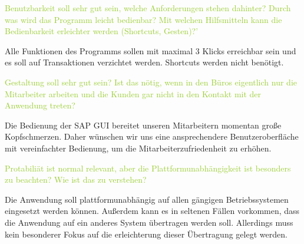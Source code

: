 \textcolor{YellowGreen}{Benutzbarkeit soll sehr gut sein, welche Anforderungen stehen dahinter? Durch was wird das Programm leicht bedienbar? Mit welchen Hilfsmitteln kann die Bedienbarkeit erleichter werden (Shortcuts, Gesten)?'}

\textcolor{NavyBlue}{Alle Funktionen des Programms sollen mit maximal 3 Klicks erreichbar sein und es soll auf Transaktionen verzichtet werden. Shortcuts werden nicht benötigt.}


\textcolor{YellowGreen}{Gestaltung soll sehr gut sein? Ist das nötig, wenn in den Büros eigentlich nur die Mitarbeiter arbeiten und die Kunden gar nicht in den Kontakt mit der Anwendung treten?}

\textcolor{NavyBlue}{Die Bedienung der SAP GUI bereitet unseren Mitarbeitern momentan große Kopfschmerzen. Daher wünschen wir uns eine ansprechendere Benutzeroberfläche mit vereinfachter Bedienung, um die Mitarbeiterzufriedenheit zu erhöhen.}


\textcolor{YellowGreen}{Protabiliät ist normal relevant, aber die Plattformunabhängigkeit ist besonders zu beachten? Wie ist das zu verstehen?}

\textcolor{NavyBlue}{Die Anwendung soll plattformunabhängig auf allen gängigen Betriebssystemen eingesetzt werden können. Außerdem kann es in seltenen Fällen vorkommen, dass die Anwendung auf ein anderes System übertragen werden soll. Allerdings muss kein besonderer Fokus auf die erleichterung dieser Übertragung gelegt werden.}